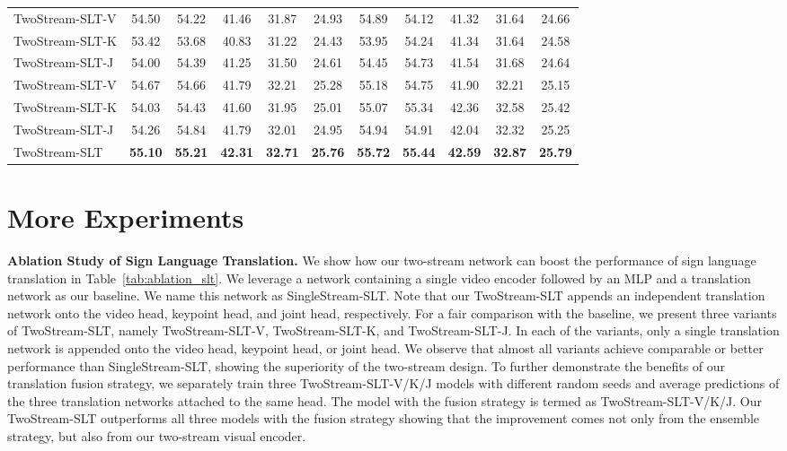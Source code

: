 \documentclass{article}
\begin{document}
\begin{table}[t]
{\begin{tabular}{l|c c c c c|c c c c c}
    \midrule
    TwoStream-SLT-V &54.50&54.22&41.46&31.87&24.93&54.89&54.12&41.32&31.64&24.66 \\
    TwoStream-SLT-K &53.42&53.68&40.83&31.22&24.43&53.95&54.24&41.34&31.64&24.58 \\
    TwoStream-SLT-J &54.00&54.39&41.25&31.50&24.61&54.45&54.73&41.54&31.68&24.64 \\
    \midrule
    TwoStream-SLT-V &54.67&54.66&41.79&32.21&25.28&55.18&54.75&41.90&32.21&25.15 \\
    TwoStream-SLT-K &54.03&54.43&41.60&31.95&25.01&55.07&55.34&42.36&32.58&25.42 \\
    TwoStream-SLT-J &54.26&54.84&41.79&32.01&24.95&54.94&54.91&42.04&32.32&25.25 \\
    \midrule
    TwoStream-SLT &\textbf{55.10}&\textbf{55.21}&\textbf{42.31}&\textbf{32.71}&\textbf{25.76}&\textbf{55.72}&\textbf{55.44}&\textbf{42.59}&\textbf{32.87}&\textbf{25.79}\\
    \bottomrule
    \end{tabular}}
\end{table}

\section{More Experiments}

\textbf{Ablation Study of Sign Language Translation.}
We show how our two-stream network can boost the performance of sign language translation in Table~\ref{tab:ablation_slt}. 
We leverage a network containing a single video encoder followed by an MLP and a translation network as our baseline.
We name this network as SingleStream-SLT. Note that our TwoStream-SLT appends an independent translation network onto the video head, keypoint head, and joint head, respectively. For a fair comparison with the baseline, we present three variants of TwoStream-SLT, namely TwoStream-SLT-V, TwoStream-SLT-K, and TwoStream-SLT-J. In each of the variants, only a single translation network is appended onto the video head, keypoint head, or joint head. We observe that almost all variants achieve comparable or better performance than SingleStream-SLT, showing the superiority of the two-stream design. To further demonstrate the benefits of our translation fusion strategy, we separately train three TwoStream-SLT-V/K/J models with different random seeds and average predictions of the three translation networks attached to the same head. The model with the fusion strategy is termed as TwoStream-SLT-V/K/J. Our TwoStream-SLT outperforms all three models with the fusion strategy showing that the improvement comes not only from the ensemble strategy, but also from our two-stream visual encoder.
\end{document}
